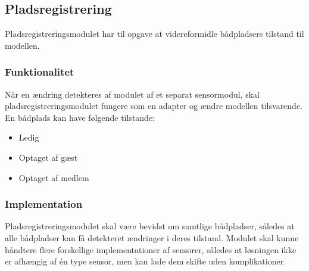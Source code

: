 \subsection{Pladsregistrering}
\label{sub:plads_registrering}

Pladsregistreringsmodulet har til opgave at videreformidle bådpladsers tilstand til modellen. 

\subsubsection{Funktionalitet}
\label{ssub:plads_registrering_funktionalitet}

Når en ændring detekteres af modulet af et separat sensormodul, skal pladsregistreringsmodulet fungere som en adapter og ændre modellen tilsvarende. En bådplads kan have følgende tilstande:

\begin{itemize}
  \item Ledig
  \item Optaget af gæst
  \item Optaget af medlem
\end{itemize}

\subsubsection{Implementation}
\label{ssub:plads_registrering_implementation}

Pladsregistreringsmodulet skal være bevidst om samtlige bådpladser, således at alle bådpladser kan få detekteret ændringer i deres tilstand. 
Modulet skal kunne håndtere flere forskellige implementationer af sensorer, således at løsningen ikke er afhængig af én type sensor, men kan lade dem skifte uden komplikationer.
